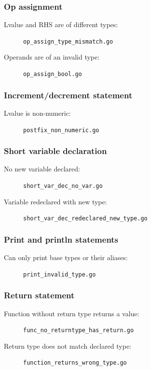 \documentclass[oneside]{article}
\begin{document}
\subsubsection{Op assignment}
\begin{description}
  \item[Lvalue and RHS are of different types:] \verb|op_assign_type_mismatch.go|
  \item[Operands are of an invalid type:] \verb|op_assign_bool.go|
\end{description}

\subsubsection{Increment/decrement statement}
\begin{description}
  \item[Lvalue is non-numeric:] \verb|postfix_non_numeric.go|
\end{description}

\subsubsection{Short variable declaration}
\begin{description}
  \item[No new variable declared:] \verb|short_var_dec_no_var.go|
  \item[Variable redeclared with new type:] \verb|short_var_dec_redeclared_new_type.go|
\end{description}

\subsubsection{Print and println statements}
\begin{description}
  \item[Can only print base types or their aliases:] \verb|print_invalid_type.go|
\end{description}

\subsubsection{Return statement}
\begin{description}
  \item[Function without return type returns a value:] \verb|func_no_returntype_has_return.go|
  \item[Return type does not match declared type:] \verb|function_returns_wrong_type.go|
\end{description}
\end{document}
